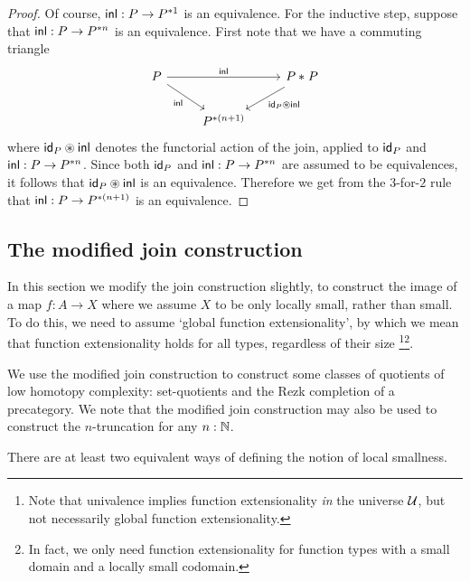\begin{proof}
Of course, $\inl:P\to P^{\ast 1}$ is an equivalence. For the inductive step,
suppose that $\inl:P\to P^{\ast n}$ is an equivalence. First note that
we have a commuting triangle
\begin{equation*}
\begin{tikzcd}
P \arrow[rr,"\inl"] \arrow[dr,swap,"\inl"] & & \join{P}{P} \arrow[dl,"{\idfunc[P] \circledast\inl}"] \\
& P^{\ast(n+1)}
\end{tikzcd}
\end{equation*}
where $\idfunc[P] \circledast\inl$ denotes the functorial action of the join, applied
to $\idfunc[P]$ and $\inl:P\to P^{\ast n}$. Since both $\idfunc[P]$ and
$\inl:P\to P^{\ast n}$ are assumed to be equivalences, it follows that
$\idfunc[P]\circledast \inl$ is an equivalence. Therefore we get from the
$3$-for-$2$ rule that $\inl:P\to P^{\ast (n+1)}$ is an equivalence. 
\end{proof}

\subsection{The modified join construction}\label{sec:modified-join}

In this section we modify the join construction slightly, to construct the
image of a map $f:A\to X$ where we assume $X$ to be only locally small, rather than
small. To do this, we need to assume `global function extensionality', by which
we mean that function extensionality holds for all types, regardless of their {size
\footnote{Note that univalence implies function extensionality \emph{in} the universe $\UU$, but not necessarily global function extensionality.}}\footnote{In fact, we only need function extensionality for function types with a small domain and a locally small codomain.}.

We use the modified join construction to construct some classes of quotients
of low homotopy complexity: 
set-quotients and the Rezk completion of a precategory. 
We note that the modified join construction may also be used to construct
the $n$-truncation for any $n:\N$. 

There are at least two equivalent ways of defining the notion of local smallness.

